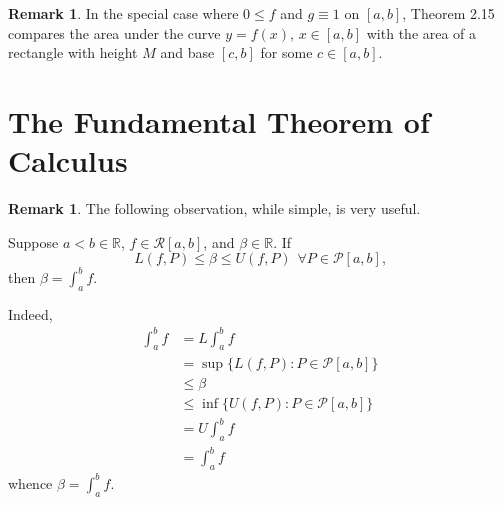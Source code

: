 \documentclass[11pt]{article}
\theoremstyle{definition}
\newtheorem{remark}[thm]{Remark}
\newcommand{\mbR}{\ensuremath{\mathbb{R}}}
\begin{document}
\begin{remark}
In the special case where $0 \leq f$ and $g \equiv 1$ on $[a, b]$, Theorem 2.15 compares the area under the curve $y = f(x)$, $x \in [a, b]$ with the area of a rectangle with height $M$ and base $[c, b]$ for some $c \in [a, b]$.
\end{remark}

\newpage

\section{The Fundamental Theorem of Calculus}

\begin{remark}
The following observation, while simple, is very useful. 

Suppose $a < b \in \mbR$, $f \in \mathcal{R}[a, b]$, and $\beta \in \mbR$. If
$$L(f, P) \leq \beta \leq U(f, P) \hspace{5pt} \forall P \in \mathcal{P}[a, b] \text{,}$$
then $\beta = \int_a^b f$. 

Indeed,
\begin{align*}
\int_a^b f & = L\int_a^b f \\
& = \sup\{L(f, P) : P \in \mathcal{P}[a, b]\} \\
& \leq \beta \\
& \leq \inf\{U(f, P) : P \in \mathcal{P}[a, b]\} \\
& = U\int_a^b f \\
& = \int_a^b f
\end{align*}
whence $\beta = \int_a^b f$.
\end{remark}
\end{document}
